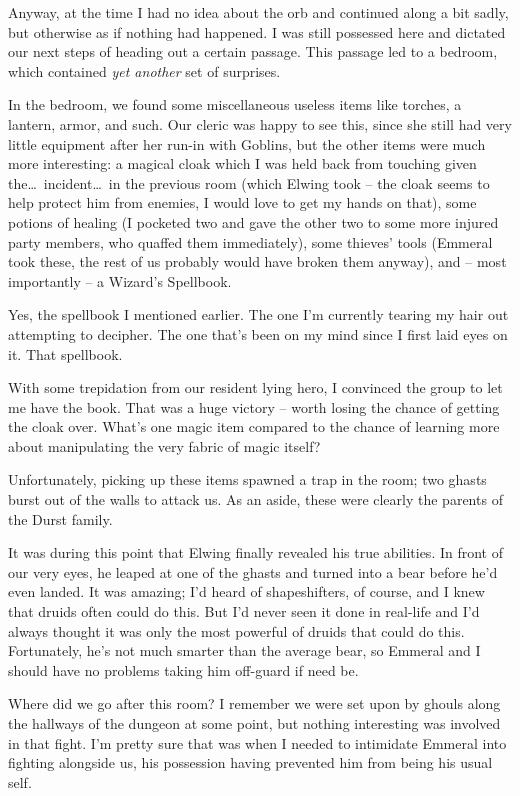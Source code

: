 Anyway, at the time I had no idea about the orb and continued along a bit sadly, but otherwise as if nothing had happened. I was still possessed here and dictated our next steps of heading out a certain passage. This passage led to a bedroom, which contained \emph{yet another} set of surprises.

In the bedroom, we found some miscellaneous useless items like torches, a lantern, armor, and such. Our cleric was happy to see this, since she still had very little equipment after her run-in with Goblins, but the other items were much more interesting: a magical cloak which I was held back from touching given the\dots\ incident\dots\ in the previous room (which Elwing took -- the cloak seems to help protect him from enemies, I would love to get my hands on that), some potions of healing (I pocketed two and gave the other two to some more injured party members, who quaffed them immediately), some thieves' tools (Emmeral took these, the rest of us probably would have broken them anyway), and -- most importantly -- a Wizard's Spellbook.

Yes, the spellbook I mentioned earlier. The one I'm currently tearing my hair out attempting to decipher. The one that's been on my mind since I first laid eyes on it. That spellbook.

With some trepidation from our resident lying hero, I convinced the group to let me have the book. That was a huge victory -- worth losing the chance of getting the cloak over. What's one magic item compared to the chance of learning more about manipulating the very fabric of magic itself?

Unfortunately, picking up these items spawned a trap in the room; two ghasts burst out of the walls to attack us. As an aside, these were clearly the parents of the Durst family.

It was during this point that Elwing finally revealed his true abilities. In front of our very eyes, he leaped at one of the ghasts and turned into a bear before he'd even landed. It was amazing; I'd heard of shapeshifters, of course, and I knew that druids often could do this. But I'd never seen it done in real-life and I'd always thought it was only the most powerful of druids that could do this. Fortunately, he's not much smarter than the average bear, so Emmeral and I should have no problems taking him off-guard if need be.

Where did we go after this room? I remember we were set upon by ghouls along the hallways of the dungeon at some point, but nothing interesting was involved in that fight. I'm pretty sure that was when I needed to intimidate Emmeral into fighting alongside us, his possession having prevented him from being his usual self.

